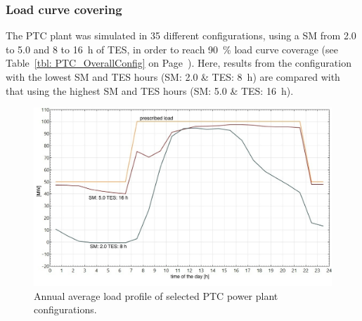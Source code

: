 \subsubsection{Load curve covering}
The PTC plant was simulated in 35 different configurations, using a SM from \num{2.0} to \num{5.0} and \num{8} to \SI{16}{h} of TES, in order to reach \SI{90}{\percent} load curve coverage (see Table~\ref{tbl: PTC_OverallConfig} on Page~\pageref{tbl: PTC_OverallConfig}). Here, results from the configuration with the lowest SM and TES hours (SM: \num{2.0} \& TES: \SI{8}{h}) are compared with that using the highest SM and TES hours  (SM: \num{5.0} \& TES: \SI{16}{h}).  

\begin{figure}[htbp]  
\centering
\includegraphics[width=0.9\linewidth]{FIG/PTC_annual_profil}
\caption[Annual average load profile of selected PTC power plant configurations.]{Annual average load profile of selected PTC power plant configurations.}\label{PTC_annual_profil}
\end{figure}

